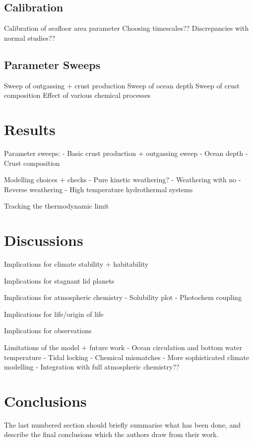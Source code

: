 \documentclass[fleqn,usenatbib]{mnras}
\begin{document}
\subsection{Calibration}
Calibration of seafloor area parameter
Choosing timescales??
Discrepancies with normal studies??

\subsection{Parameter Sweeps}

Sweep of outgassing + crust production
Sweep of ocean depth
Sweep of crust composition
Effect of various chemical processes

\section{Results}

Parameter sweeps:
- Basic crust production + outgassing sweep
- Ocean depth
- Crust composition

Modelling choices + checks
- Pure kinetic weathering?
- Weathering with no 
- Reverse weathering
- High temperature hydrothermal systems

Tracking the thermodynamic limit

\section{Discussions}

Implications for climate stability + habitability

Implications for stagnant lid planets

Implications for atmospheric chemistry
- Solubility plot
- Photochem coupling

Implications for life/origin of life

Implications for observations

Limitations of the model + future work
- Ocean circulation and bottom water temperature
- Tidal locking
- Chemical mismatches
- More sophisticated climate modelling
- Integration with full atmospheric chemistry??

\section{Conclusions}

The last numbered section should briefly summarise what has been done, and describe
the final conclusions which the authors draw from their work.
\end{document}
